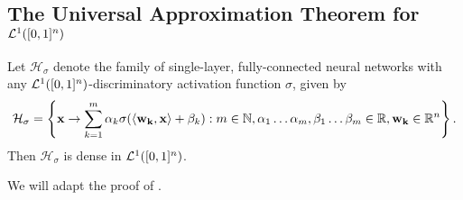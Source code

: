 \subsection{The Universal Approximation Theorem for ${\mathcal {L}^1}([0,1]^n)$}
\label{subsection:universality:lone:2}
\begin{theorem}
\label{thm:universality:lone:discrim}
Let $\mathcal{H}_{\sigma}$ denote the family of single-layer, fully-connected neural networks with any ${\mathcal {L}^1}([0,1]^n)$-discriminatory activation function $\sigma$, given by \begin{align*}
\mathcal{H}_{\sigma} = \left \{ \mathbf{x} \to \sum_{k=1}^{m} \alpha_k \sigma{\left (\langle \mathbf{w_k}, \mathbf{x} \rangle + \beta_k \right)} : m \in {\mathbb N}, \alpha_1 \ldots \alpha_m , \beta_1 \ldots \beta_m \in {\mathbb R}, \mathbf{w_k} \in {\mathbb R}^n \right \}.
\end{align*}
Then $\mathcal{H}_{\sigma}$ is dense in ${\mathcal {L}^1}([0,1]^n)$.
\end{theorem}
\begin{proof-idea*} We will adapt the proof of .
\end{proof-idea*}
